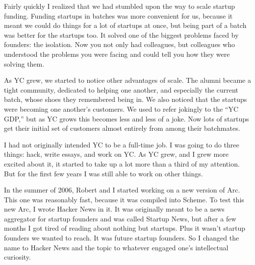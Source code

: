 \documentclass[12pt]{book}
\begin{document}
Fairly quickly I realized that we had stumbled upon the way to scale
startup funding. Funding startups in batches was more convenient for us,
because it meant we could do things for a lot of startups at once, but
being part of a batch was better for the startups too. It solved one of
the biggest problems faced by founders: the isolation. Now you not only
had colleagues, but colleagues who understood the problems you were
facing and could tell you how they were solving them.

As YC grew, we started to notice other advantages of scale. The alumni
became a tight community, dedicated to helping one another, and
especially the current batch, whose shoes they remembered being in. We
also noticed that the startups were becoming one another's customers. We
used to refer jokingly to the ``YC GDP,'' but as YC grows this becomes
less and less of a joke. Now lots of startups get their initial set of
customers almost entirely from among their batchmates.

I had not originally intended YC to be a full-time job. I was going to
do three things: hack, write essays, and work on YC. As YC grew, and I
grew more excited about it, it started to take up a lot more than a
third of my attention. But for the first few years I was still able to
work on other things.

In the summer of 2006, Robert and I started working on a new version of
Arc. This one was reasonably fast, because it was compiled into Scheme.
To test this new Arc, I wrote Hacker News in it. It was originally meant
to be a news aggregator for startup founders and was called Startup
News, but after a few months I got tired of reading about nothing but
startups. Plus it wasn't startup founders we wanted to reach. It was
future startup founders. So I changed the name to Hacker News and the
topic to whatever engaged one's intellectual curiosity.
\end{document}
